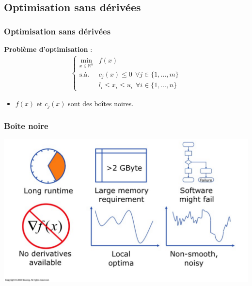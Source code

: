 \documentclass{beamer}
\newcommand{\R}{\mathbb{R}}
\begin{document}
\subsection{Optimisation sans dérivées}
\begin{frame} %
\frametitle{Optimisation sans dérivées}
\textbf{Problème d'optimisation} :
\begin{align*}
	\begin{cases}
		\underset{x\in \R^n}{\min} & f(x) \\
		\text{s.à.} & c_j(x) \leq 0 ~ ~ \forall j \in \{1,\dots,m\}\\
		~ & l_i \leq x_i \leq u_i ~ ~ \forall i \in \{1,\dots,n\}
	\end{cases}
\end{align*}
\begin{itemize}
	\pause
	\item $f(x)$ et $c_j(x)$ sont des boîtes noires.
\end{itemize}
\bigskip

\end{frame}
\begin{frame}%
	\frametitle{Boîte noire}
	\includegraphics[width=\linewidth]{blackbox.png}
\end{frame}
\end{document}
